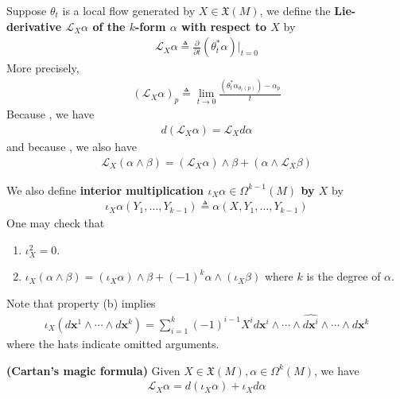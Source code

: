 \documentclass{report}
\begin{document}
\begin{mdframed}
Suppose $\theta_t$ is a local flow generated by $X \in \mathfrak{X}(M)$, we define the \textbf{Lie-derivative $\mathcal{L}_X \alpha $ of the $k$-form  $\alpha $ with respect to $X$} by 
\begin{align*}
\mathcal{L}_X \alpha \triangleq \frac{\partial }{\partial t} (\theta_t^* \alpha )\Big|_{t=0}
\end{align*}
More precisely, 
\begin{align*}
  (\mathcal{L}_X \alpha)_p \triangleq  \lim_{t\to 0} \frac{(\theta_t ^{*}\alpha_{\theta_t (p)}) -\alpha_p }{t} 
\end{align*}
Because , we have 
\begin{align*}
d(\mathcal{L}_X \alpha )= \mathcal{L}_X d\alpha 
\end{align*}
and because , we also have 
\begin{align*}
\mathcal{L}_X (\alpha \wedge  \beta  )= (\mathcal{L}_X \alpha )\wedge  \beta + (\alpha \wedge  \mathcal{L}_X \beta  ) 
\end{align*}


We also define \textbf{interior multiplication  $\iota_X \alpha \in \Omega^{k-1}(M)$ by $X$} by 
\begin{align*}
\iota_X \alpha (Y_1,\dots ,Y_{k-1})\triangleq \alpha (X,Y_1,\dots ,Y_{k-1})
\end{align*}
One may check that 
\begin{enumerate}[label=(\alph*)]
  \item $\iota_X^2=0 $.
  \item $\iota_X (\alpha \wedge  \beta  )=(\iota_X \alpha   )\wedge  \beta + (-1)^k \alpha \wedge  (\iota_X \beta   )$ where $k$ is the degree of  $\alpha$. 
\end{enumerate}
Note that property (b) implies 
\begin{align*}
\iota_X (d\textbf{x}^1\wedge  \cdots \wedge  d\textbf{x}^k)=\sum_{i=1}^k (-1)^{i-1}X^i d\textbf{x}^i \wedge \cdots \wedge  \widehat{d\textbf{x}^i} \wedge \cdots \wedge  d\textbf{x}^k      
\end{align*}
where the hats indicate omitted arguments.   
\end{mdframed}
\begin{theorem}
\textbf{(Cartan's magic formula)} Given $X \in \mathfrak{X}(M),\alpha  \in \Omega^k(M)$, we have 
\begin{align*}
\mathcal{L}_X\alpha = d(\iota_X \alpha  )+ \iota_X d \alpha 
\end{align*}
\end{theorem}
\end{document}
